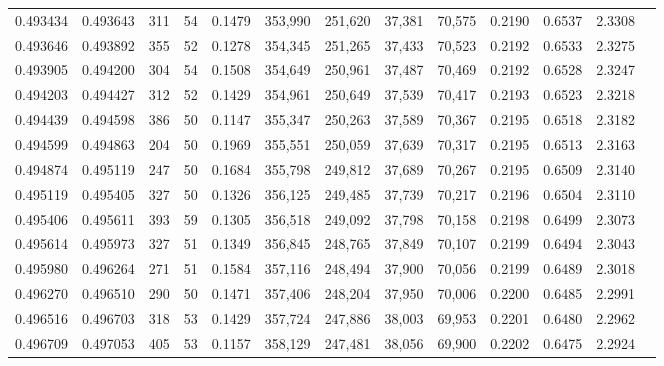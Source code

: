\begin{tabular}{rrrrrrrrrrrrr}
0.493434 & 0.493643 &   311 &  54 &                                     0.1479 & 353,990 & 251,620 &  37,381 &  70,575 & 0.2190 & 0.6537 & 2.3308 \\
0.493646 & 0.493892 &   355 &  52 &                                     0.1278 & 354,345 & 251,265 &  37,433 &  70,523 & 0.2192 & 0.6533 & 2.3275 \\
0.493905 & 0.494200 &   304 &  54 &                                     0.1508 & 354,649 & 250,961 &  37,487 &  70,469 & 0.2192 & 0.6528 & 2.3247 \\
0.494203 & 0.494427 &   312 &  52 &                                     0.1429 & 354,961 & 250,649 &  37,539 &  70,417 & 0.2193 & 0.6523 & 2.3218 \\
0.494439 & 0.494598 &   386 &  50 &                                     0.1147 & 355,347 & 250,263 &  37,589 &  70,367 & 0.2195 & 0.6518 & 2.3182 \\
0.494599 & 0.494863 &   204 &  50 &                                     0.1969 & 355,551 & 250,059 &  37,639 &  70,317 & 0.2195 & 0.6513 & 2.3163 \\
0.494874 & 0.495119 &   247 &  50 &                                     0.1684 & 355,798 & 249,812 &  37,689 &  70,267 & 0.2195 & 0.6509 & 2.3140 \\
0.495119 & 0.495405 &   327 &  50 &                                     0.1326 & 356,125 & 249,485 &  37,739 &  70,217 & 0.2196 & 0.6504 & 2.3110 \\
0.495406 & 0.495611 &   393 &  59 &                                     0.1305 & 356,518 & 249,092 &  37,798 &  70,158 & 0.2198 & 0.6499 & 2.3073 \\
0.495614 & 0.495973 &   327 &  51 &                                     0.1349 & 356,845 & 248,765 &  37,849 &  70,107 & 0.2199 & 0.6494 & 2.3043 \\
0.495980 & 0.496264 &   271 &  51 &                                     0.1584 & 357,116 & 248,494 &  37,900 &  70,056 & 0.2199 & 0.6489 & 2.3018 \\
0.496270 & 0.496510 &   290 &  50 &                                     0.1471 & 357,406 & 248,204 &  37,950 &  70,006 & 0.2200 & 0.6485 & 2.2991 \\
0.496516 & 0.496703 &   318 &  53 &                                     0.1429 & 357,724 & 247,886 &  38,003 &  69,953 & 0.2201 & 0.6480 & 2.2962 \\
0.496709 & 0.497053 &   405 &  53 &                                     0.1157 & 358,129 & 247,481 &  38,056 &  69,900 & 0.2202 & 0.6475 & 2.2924 \\

\end{tabular}
